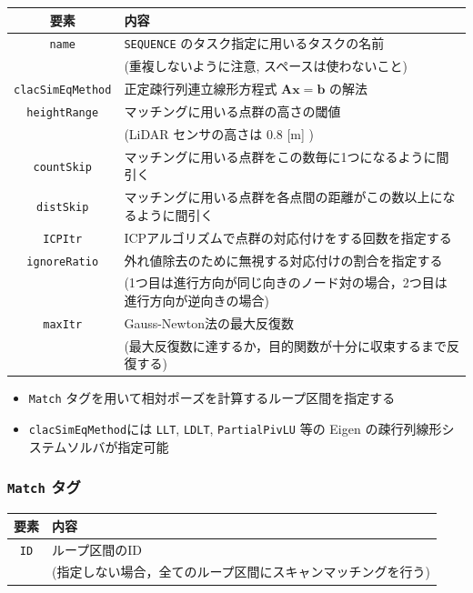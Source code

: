 \documentclass[dvipdfmx]{jsarticle}
\begin{document}
\begin{tabular}{c|l}
	\hline
	要素 & 内容 \\
	\hline \hline
	\verb|name| & \verb|SEQUENCE| のタスク指定に用いるタスクの名前 \vspace{-5pt}\\
		& (重複しないように注意, スペースは使わないこと) \\
	\verb|clacSimEqMethod| & 正定疎行列連立線形方程式 $\bm{A} \bm{x} = \bm{b}$ の解法 \\
	\verb|heightRange| & マッチングに用いる点群の高さの閾値 \vspace{-5pt}\\
		& (LiDAR センサの高さは 0.8 [m] ) \\
	\verb|countSkip| & マッチングに用いる点群をこの数毎に1つになるように間引く \\
	\verb|distSkip| & マッチングに用いる点群を各点間の距離がこの数以上になるように間引く \\
	\verb|ICPItr| & ICPアルゴリズムで点群の対応付けをする回数を指定する \\
	\verb|ignoreRatio| & 外れ値除去のために無視する対応付けの割合を指定する \vspace{-5pt}\\
		& (1つ目は進行方向が同じ向きのノード対の場合，2つ目は進行方向が逆向きの場合) \\
	\verb|maxItr| & Gauss-Newton法の最大反復数 \vspace{-5pt}\\
		& (最大反復数に達するか，目的関数が十分に収束するまで反復する) \\
	\hline
\end{tabular}

\begin{itemize}
	\item \verb|Match| タグを用いて相対ポーズを計算するループ区間を指定する
	\item \verb|clacSimEqMethod|には \verb|LLT|, \verb|LDLT|, \verb|PartialPivLU| 等の Eigen の疎行列線形システムソルバが指定可能
\end{itemize}

\cprotect \subsubsection{\verb|Match| タグ}
\begin{tabular}{c|l}
	\hline
	要素 & 内容 \\
	\hline \hline
	\verb|ID| & ループ区間のID \vspace{-5pt}\\
		& (指定しない場合，全てのループ区間にスキャンマッチングを行う) \\
	\hline
\end{tabular} \\
\end{document}
